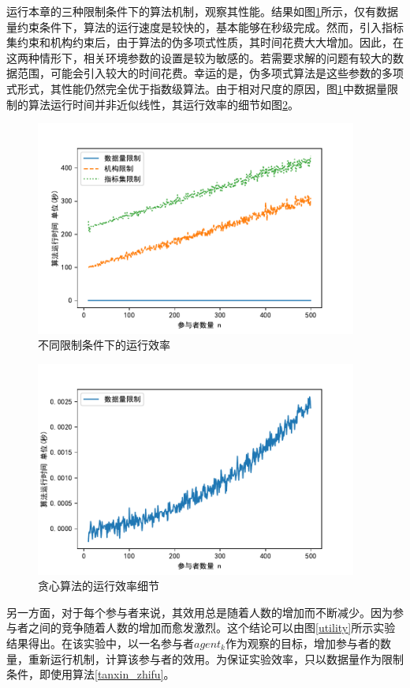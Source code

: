 \documentclass[promaster]{thesis-uestc}
\begin{document}
运行本章的三种限制条件下的算法机制，观察其性能。结果如图\ref{times}所示，仅有数据量约束条件下，算法的运行速度是较快的，基本能够在秒级完成。然而，引入指标集约束和机构约束后，由于算法的伪多项式性质，其时间花费大大增加。因此，在这两种情形下，相关环境参数的设置是较为敏感的。若需要求解的问题有较大的数据范围，可能会引入较大的时间花费。幸运的是，伪多项式算法是这些参数的多项式形式，其性能仍然完全优于指数级算法。由于相对尺度的原因，图\ref{times}中数据量限制的算法运行时间并非近似线性，其运行效率的细节如图\ref{greedytimes}。

\begin{figure}[H]
    \includegraphics[width=300pt]{exp/threetimes.pdf}
    \caption{不同限制条件下的运行效率}
    \label{times}
\end{figure}

\begin{figure}[H]
    \includegraphics[width=300pt]{exp/greedytimes.pdf}
    \caption{贪心算法的运行效率细节}
    \label{greedytimes}
\end{figure}

另一方面，对于每个参与者来说，其效用总是随着人数的增加而不断减少。因为参与者之间的竞争随着人数的增加而愈发激烈。这个结论可以由图\ref{utility}所示实验结果得出。在该实验中，以一名参与者$agent_k$作为观察的目标，增加参与者的数量，重新运行机制，计算该参与者的效用。为保证实验效率，只以数据量作为限制条件，即使用算法\ref{tanxin_zhifu}。
\end{document}
